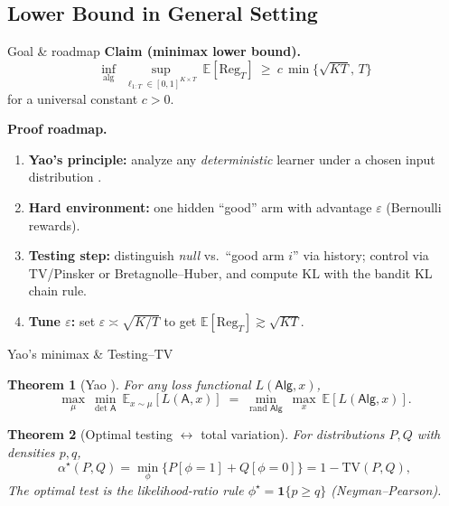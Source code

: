 \documentclass{beamer}
\newtheorem{thm}{Theorem}
\newcommand{\E}{\mathbb{E}}
\newcommand{\Reg}{\mathrm{Reg}}
\newcommand{\KL}{\mathrm{KL}}
\begin{document}
\subsection{Lower Bound in General Setting}
\begin{frame}{Goal \& roadmap}
  \textbf{Claim (minimax lower bound).}
  \[
    \inf_{\text{alg}}\ \sup_{\ell_{1:T}\in[0,1]^{K\times T}}\ \E[\Reg_T]
    \ \ge\ c\,\min\{\sqrt{KT},\,T\}
  \]
  for a universal constant $c>0$.

  \vspace{0.6em}
  \textbf{Proof roadmap.}
  \begin{enumerate}\itemsep4pt
    \item \textbf{Yao's principle:} analyze any \emph{deterministic} learner under a chosen input distribution \cite{Yao1977}.
    \item \textbf{Hard environment:} one hidden “good” arm with advantage $\varepsilon$ (Bernoulli rewards).
    \item \textbf{Testing step:} distinguish \emph{null} vs.\ “good arm $i$” via history; control via TV/Pinsker or Bretagnolle–Huber, and compute $\KL$ with the bandit KL chain rule.
    \item \textbf{Tune $\varepsilon$:} set $\varepsilon\asymp \sqrt{K/T}$ to get $\E[\Reg_T]\gtrsim \sqrt{KT}$.
  \end{enumerate}
\end{frame}

\begin{frame}{Yao's minimax \& Testing--TV }
  \begin{thm}[Yao \cite{Yao1977}]
    For any loss functional $L(\mathsf{Alg},x)$,
    \[
      \max_{\mu}\ \min_{\text{det }\mathsf{A}} 
      \ \mathbb{E}_{x\sim \mu}[L(\mathsf{A},x)]
      \;=\;
      \min_{\text{rand }\mathsf{Alg}}\ \max_{x}\ 
      \mathbb{E}[L(\mathsf{Alg},x)].
    \]
  \end{thm}

  \vspace{0.5em}

  \begin{thm}[Optimal testing $\leftrightarrow$ total variation]
    For distributions $P,Q$ with densities $p,q$,
    \[
      \alpha^\star(P,Q)=\min_{\phi}\{P[\phi=1]+Q[\phi=0]\}=1-\mathrm{TV}(P,Q),
    \]
    The optimal test is the likelihood-ratio rule $\phi^\star=\mathbf{1}\{p\ge q\}$ (Neyman–Pearson).
  \end{thm}
\end{frame}
\end{document}
